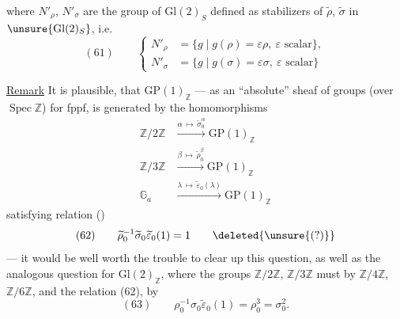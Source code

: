 
where $N'_\rho$, $N'_\sigma$ are the group  of $\mathrm{Gl}(2)_S$ defined   as stabilizers of $\widetilde\rho$, $\widetilde\sigma$ in $\unsure{\mathrm{Gl}(2)_S}$, i.e.
\[
(61)\qquad
\left\{\begin{aligned}
N'_\rho&=\{g\mid g(\rho)=\varepsilon\rho,\ \varepsilon\text{ scalar}\},\\
N'_\sigma&=\{g\mid g(\sigma)=\varepsilon\sigma,\ \varepsilon\text{ scalar}\}
\end{aligned}\right.
\]

\uline{Remark} It is plausible,   that $\mathrm{GP}(1)_{\mathbb Z}$ --- as an ``absolute'' sheaf of groups (over $\operatorname{Spec}\mathbb Z$) for fppf, is generated by the homomorphisms
\[
\begin{aligned}
\mathbb Z/2\mathbb Z&\xrightarrow{\alpha\,\mapsto\,\widetilde\sigma_0^{\alpha}}\mathrm{GP}(1)_{\mathbb Z}\\
\mathbb Z/3\mathbb Z&\xrightarrow{\beta\,\mapsto\,\widetilde\rho_0^{\beta}}\mathrm{GP}(1)_{\mathbb Z}\\
\mathbb G_a&\xrightarrow{\lambda\,\mapsto\,\widetilde\varepsilon_0(\lambda)}\mathrm{GP}(1)_{\mathbb Z}
\end{aligned}
\]
satisfying   relation ()
\[
(62)\qquad \widetilde\rho_0^{-1}\widetilde\sigma_0\widetilde\varepsilon_0(1)=1
\qquad\deleted{\unsure{(?)}}
\]
--- it would be well worth the trouble to clear up this question, as well as the analogous question for $\mathrm{Gl}(2)_{\mathbb Z}$, where the  groups $\mathbb Z/2\mathbb Z$, $\mathbb Z/3\mathbb Z$ must  by $\mathbb Z/4\mathbb Z$, $\mathbb Z/6\mathbb Z$, and the relation (62), by
\[
(63)\qquad \rho_0^{-1}\sigma_0\widetilde\varepsilon_0(1)=\rho_0^3=\sigma_0^2.
\]


